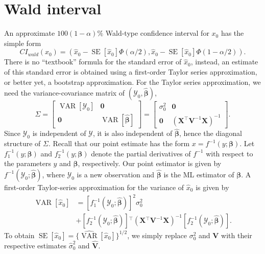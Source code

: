 \documentclass{article}\usepackage[]{graphicx}\usepackage[]{color}
\newcommand{\trans}{\ensuremath{^\top}}
\newcommand{\VAR}{\operatorname{VAR}}
\newcommand{\SE}{\operatorname{SE}}
\begin{document}

\section{Wald interval}\label{sec:wald}

An approximate $100(1-\alpha)\%$ Wald-type confidence interval for $x_0$ has the simple form
\begin{equation}
\label{eqn:wald}
  CI_{wald}\left(x_0\right) = \left( \widehat{x}_0 -  \SE\left[\widehat{x}_0\right]\Phi\left(\alpha/2\right),  \widehat{x}_0 -  \SE\left[\widehat{x}_0\right]\Phi\left(1-\alpha/2\right) \right).
\end{equation}
There is no ``textbook'' formula for the standard error of $\widehat{x}_0$, instead, an estimate of this standard error is obtained using a first-order Taylor series approximation, or better yet, a bootstrap approximation.  For the Taylor series approximation, we need the variance-covariance matrix of $\left(\mathcal{Y}_0, \widehat{\bm{\beta}}\right)$,
\[
\Sigma = \begin{bmatrix}
           \VAR\left[\mathcal{Y}_0\right] & \bm{0} \\
           \bm{0} & \VAR\left[\widehat{\bm{\beta}}\right]
         \end{bmatrix} = \begin{bmatrix}
           \sigma_0^2 & \bm{0} \\
           \bm{0} & \left(\bm{X}\trans\bm{V}^{-1}\bm{X}\right)^{-1}
         \end{bmatrix}.
\]
Since $\mathcal{Y}_0$ is independent of $\bm{\mathcal{Y}}$, it is also independent of $\widehat{\bm{\beta}}$, hence the diagonal structure of $\Sigma$. Recall that our point estimate has the form $x = f^{-1}\left(y; \bm{\beta}\right)$. Let $f_1^{-1}\left(y; \bm{\beta}\right)$ and $f_2^{-1}\left(y; \bm{\beta}\right)$ denote the partial derivatives of $f^{-1}$ with respect to the parameters $y$ and $\bm{\beta}$, respectively. Our point estimator is given by $f^{-1}\left(\mathcal{Y}_0; \widehat{\bm{\beta}}\right)$, where $\mathcal{Y}_0$ is a new observation and $\widehat{\bm{\beta}}$ is the ML estimator of $\bm{\beta}$.  A first-order Taylor-series approximation for the variance of $\widehat{x}_0$ is given by
\begin{align}
  \VAR\left[\widehat{x}_0\right] &= \left[f_1^{-1}\left(\mathcal{Y}_0; \widehat{\bm{\beta}}\right)\right]^2\sigma_0^2 \nonumber \\
   &+ \left[f_2^{-1}\left(\mathcal{Y}_0; \widehat{\bm{\beta}}\right)\right]\trans\left(\bm{X}\trans\bm{V}^{-1}\bm{X}\right)^{-1}\left[f_2^{-1}\left(\mathcal{Y}_0; \widehat{\bm{\beta}}\right)\right].
\end{align}
To obtain $\SE\left[\widehat{x}_0\right] = \Big\{ \widehat{\VAR}\left[\widehat{x}_0\right] \Big\}^{1/2}$, we simply replace $\sigma_0^2$ and $\bm{V}$ with their respective estimates $\widehat{\sigma}_0^2$ and $\widehat{\bm{V}}$.
\end{document}
